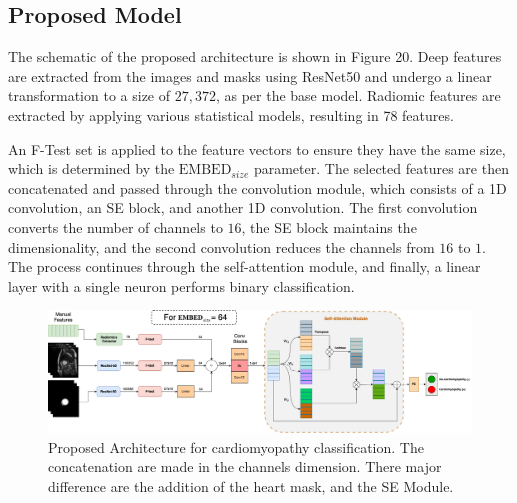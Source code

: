 \documentclass[journal,twoside,web]{ieeecolor}
\begin{document}
\subsection{Proposed Model}

The schematic of the proposed architecture is shown in Figure 20. Deep features are extracted from the images and masks using ResNet50 and undergo a linear transformation to a size of $27,372$, as per the base model. Radiomic features are extracted by applying various statistical models, resulting in 78 features.

An F-Test set is applied to the feature vectors to ensure they have the same size, which is determined by the $\text{EMBED}_{size}$ parameter. The selected features are then concatenated and passed through the convolution module, which consists of a 1D convolution, an \gls{SE} block, and another 1D convolution. The first convolution converts the number of channels to $16$, the SE block maintains the dimensionality, and the second convolution reduces the channels from $16$ to $1$. The process continues through the self-attention module, and finally, a linear layer with a single neuron performs binary classification.


\begin{figure}[h]
\centerline{\includegraphics[width=\columnwidth]{figures/fig02.png}}
\caption{Proposed Architecture for cardiomyopathy classification. The concatenation are made in the channels dimension. There major difference are the addition of the heart mask, and the SE Module.}
\label{fig02}
\end{figure}

\end{document}

